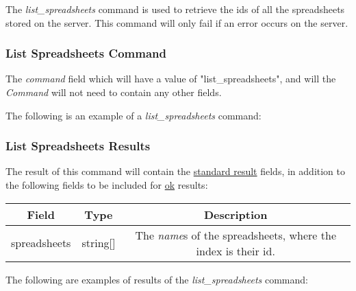 The \emph{list\_spreadsheets} command is used to retrieve the ids of all the 
spreadsheets stored on the server. This command will only fail if an error 
occurs on the server.

\subsubsection{List Spreadsheets Command}
The \emph{command} field which will have a value of "list\_spreadsheets", and will the \emph{Command} will not need to contain any other fields.

The following is an example of a \emph{list\_spreadsheets} command:


\subsubsection{List Spreadsheets Results}
The result of this command will contain the \hyperref[sec:message:result]{standard result} fields, in addition to the following fields to be included for \underline{ok} results:
\begin{table}[H]
    \begin{center}
        \begin{tabular}{|c|c|c|}\hline
            Field & Type & Description \\\hline
            spreadsheets & string[] & The \emph{name}s of the spreadsheets, where the index is their id. \\\hline
        \end{tabular}
    \end{center}
\end{table}

The following are examples of results of the \emph{list\_spreadsheets} command:




